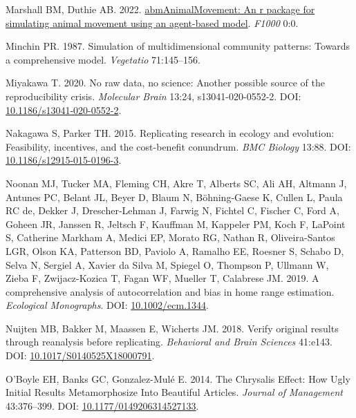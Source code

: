\documentclass[10pt,a4paper]{article}
\newlength{\cslhangindent}
\newlength{\cslentryspacingunit} %
\newenvironment{CSLReferences}[2] %
 {%
  \setlength{\parindent}{0pt}
  \ifodd #1
  \let\oldpar\par
  \def\par{\hangindent=\cslhangindent\oldpar}
  \fi
  \setlength{\parskip}{#2\cslentryspacingunit}
 }%
 {}
\begin{document}
\begin{CSLReferences}{1}{0}
\leavevmode{}%
Marshall BM, Duthie AB. 2022. \href{https://0}{abmAnimalMovement: An r package for simulating animal movement using an agent-based model}. \emph{F1000} 0:0.

\leavevmode{}%
Minchin PR. 1987. Simulation of multidimensional community patterns: Towards a comprehensive model. \emph{Vegetatio} 71:145--156.

\leavevmode{}%
Miyakawa T. 2020. No raw data, no science: Another possible source of the reproducibility crisis. \emph{Molecular Brain} 13:24, s13041-020-0552-2. DOI: \href{https://doi.org/10.1186/s13041-020-0552-2}{10.1186/s13041-020-0552-2}.

\leavevmode{}%
Nakagawa S, Parker TH. 2015. Replicating research in ecology and evolution: Feasibility, incentives, and the cost-benefit conundrum. \emph{BMC Biology} 13:88. DOI: \href{https://doi.org/10.1186/s12915-015-0196-3}{10.1186/s12915-015-0196-3}.

\leavevmode{}%
Noonan MJ, Tucker MA, Fleming CH, Akre T, Alberts SC, Ali AH, Altmann J, Antunes PC, Belant JL, Beyer D, Blaum N, Böhning-Gaese K, Cullen L, Paula RC de, Dekker J, Drescher-Lehman J, Farwig N, Fichtel C, Fischer C, Ford A, Goheen JR, Janssen R, Jeltsch F, Kauffman M, Kappeler PM, Koch F, LaPoint S, Catherine Markham A, Medici EP, Morato RG, Nathan R, Oliveira-Santos LGR, Olson KA, Patterson BD, Paviolo A, Ramalho EE, Roesner S, Schabo D, Selva N, Sergiel A, Xavier da Silva M, Spiegel O, Thompson P, Ullmann W, Zieba F, Zwijacz-Kozica T, Fagan WF, Mueller T, Calabrese JM. 2019. A comprehensive analysis of autocorrelation and bias in home range estimation. \emph{Ecological Monographs}. DOI: \href{https://doi.org/10.1002/ecm.1344}{10.1002/ecm.1344}.

\leavevmode{}%
Nuijten MB, Bakker M, Maassen E, Wicherts JM. 2018. Verify original results through reanalysis before replicating. \emph{Behavioral and Brain Sciences} 41:e143. DOI: \href{https://doi.org/10.1017/S0140525X18000791}{10.1017/S0140525X18000791}.

\leavevmode{}%
O'Boyle EH, Banks GC, Gonzalez-Mulé E. 2014. The {Chrysalis} {Effect}: {How} {Ugly} {Initial} {Results} {Metamorphosize} {Into} {Beautiful} {Articles}. \emph{Journal of Management} 43:376--399. DOI: \href{https://doi.org/10.1177/0149206314527133}{10.1177/0149206314527133}.


\end{CSLReferences}
\end{document}

